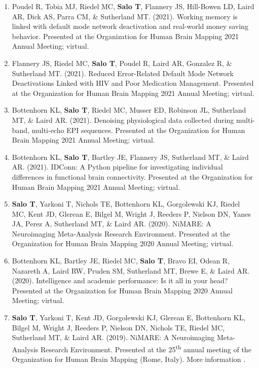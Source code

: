 \documentclass[10pt]{article}
\newcommand{\textlink}[3][blue]{\href{#2}{\color{#1}{#3}}}
\begin{document}
\begin{enumerate}

	\item Poudel R, Tobia MJ, Riedel MC, \textbf{Salo T}, Flannery JS, Hill-Bowen LD, Laird AR, Dick AS, Parra CM, \& Sutherland MT.
	(2021).
	Working memory is linked with default mode network deactivation and real-world money saving behavior.
	Presented at the Organization for Human Brain Mapping 2021 Annual Meeting; virtual.

	\item Flannery JS, Riedel MC, \textbf{Salo T}, Poudel R, Laird AR, Gonzalez R, \& Sutherland MT.
	(2021).
	Reduced Error-Related Default Mode Network Deactivations Linked with HIV and Poor Medication Management.
	Presented at the Organization for Human Brain Mapping 2021 Annual Meeting; virtual.

	\item Bottenhorn KL, \textbf{Salo T}, Riedel MC, Musser ED, Robinson JL, Sutherland MT, \& Laird AR.
	(2021).
	Denoising physiological data collected during multi-band, multi-echo EPI sequences.
	Presented at the Organization for Human Brain Mapping 2021 Annual Meeting; virtual.

	\item Bottenhorn KL, \textbf{Salo T}, Bartley JE, Flannery JS, Sutherland MT, \& Laird AR.
	(2021).
	IDConn: A Python pipeline for investigating individual differences in functional brain connectivity.
	Presented at the Organization for Human Brain Mapping 2021 Annual Meeting; virtual.

	\item \textbf{Salo T}, Yarkoni T, Nichols TE, Bottenhorn KL, Gorgolewski KJ, Riedel MC, Kent JD, Glerean E, Bilgel M, Wright J, Reeders P, Nielson DN, Yanes JA, Perez A, Sutherland MT, \& Laird AR.
	(2020).
	NiMARE: A Neuroimaging Meta-Analysis Research Environment.
	Presented at the Organization for Human Brain Mapping 2020 Annual Meeting; virtual.

	\item Bottenhorn KL, Bartley JE, Riedel MC, \textbf{Salo T}, Bravo EI, Odean R, Nazareth A, Laird RW, Pruden SM, Sutherland MT, Brewe E, \& Laird AR.
	(2020).
	Intelligence and academic performance: Is it all in your head?
	Presented at the Organization for Human Brain Mapping 2020 Annual Meeting; virtual.

	\item \textbf{Salo T}, Yarkoni T, Kent JD, Gorgolewski KJ, Glerean E, Bottenhorn KL, Bilgel M, Wright J, Reeders P, Nielson DN, Nichols TE, Riedel MC, Sutherland MT, \& Laird AR.
	(2019).
	NiMARE: A Neuroimaging Meta-Analysis Research Environment.
	Presented at the 25\textsuperscript{th} annual meeting of the Organization
	for Human Brain Mapping (Rome, Italy).
	More information
	\textlink{https://ww5.aievolution.com/hbm1901/index.cfm?do=abs.viewAbs&abs=4138}{here}.


\end{enumerate}
\end{document}
